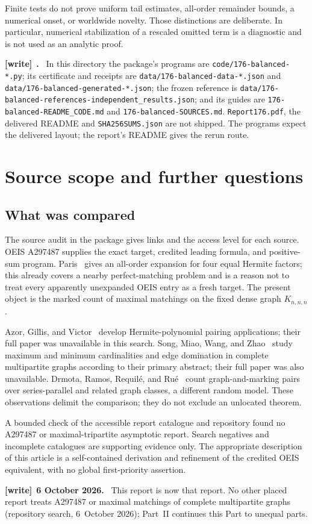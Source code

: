 \documentclass[11pt,letterpaper]{article}
\theoremstyle{remark}\newtheorem{remark}[theorem]{Remark}
\newcommand{\file}[1]{\nolinkurl{#1}}
\newenvironment{writenote}[1][]{\par\smallskip\begingroup\small
 \noindent\textbf{[write]}\if\relax\detokenize{#1}\relax\else~\textbf{#1.}\fi\ }%
 {\par\endgroup\smallskip}
\begin{document}
Finite tests do not prove uniform tail estimates, all-order remainder bounds, a numerical onset, or worldwide novelty. Those distinctions are deliberate. In particular, numerical stabilization of a rescaled omitted term is a diagnostic and is not used as an analytic proof.
\begin{writenote}
In this directory the package's programs are \file{code/176-balanced-*.py}; its certificate and receipts are \file{data/176-balanced-data-*.json} and \file{data/176-balanced-generated-*.json}; the frozen reference is \file{data/176-balanced-references-independent_results.json}; and its guides are \file{176-balanced-README_CODE.md} and \file{176-balanced-SOURCES.md}. \file{Report176.pdf}, the delivered README and \file{SHA256SUMS.json} are not shipped. The programs expect the delivered layout; the report's README gives the rerun route.
\end{writenote}

\section{Source scope and further questions}\label{tmm:bal:sec:sources}
\subsection{What was compared}
The source audit in the package gives links and the access level for each source. OEIS A297487 supplies the exact target, credited leading formula, and positive-sum program. Paris~\cite{paris} gives an all-order expansion for four equal Hermite factors; this already covers a nearby perfect-matching problem and is a reason not to treat every apparently unexpanded OEIS entry as a fresh target. The present object is the marked count of maximal matchings on the fixed dense graph $K_{n,n,n}$.

Azor, Gillis, and Victor~\cite{azor} develop Hermite-polynomial pairing applications; their full paper was unavailable in this search. Song, Miao, Wang, and Zhao~\cite{song} study maximum and minimum cardinalities and edge domination in complete multipartite graphs according to their primary abstract; their full paper was also unavailable. Drmota, Ramos, Requil\'e, and Ru\'e~\cite{drmota} count graph-and-marking pairs over series-parallel and related graph classes, a different random model. These observations delimit the comparison; they do not exclude an unlocated theorem.

A bounded check of the accessible report catalogue and repository found no A297487 or maximal-tripartite asymptotic report. Search negatives and incomplete catalogues are supporting evidence only. The appropriate description of this article is a self-contained derivation and refinement of the credited OEIS equivalent, with no global first-priority assertion.
\begin{writenote}[6 October 2026]
This report is now that report. No other placed report treats A297487 or maximal matchings of complete multipartite graphs (repository search, 6~October 2026); Part~II continues this Part to unequal parts.
\end{writenote}
\end{document}
